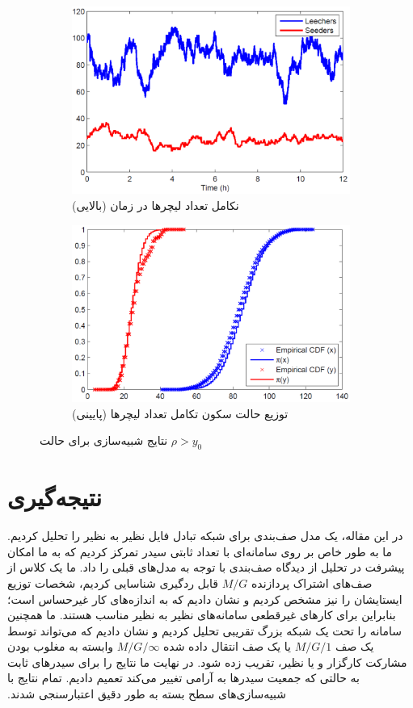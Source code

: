 \documentclass[11pt, oneside]{article}
\begin{document}
\begin{figure}[!ht]
	\centering
	\begin{subfigure}[b]{0.5\columnwidth}
		\centering
		\includegraphics[width=0.8\columnwidth]{resources/fig4_a.png}
		\caption{نکامل تعداد لیچرها در زمان (بالایی)}
	\end{subfigure}\hfill
	\begin{subfigure}[b]{0.5\columnwidth}
		\centering
		\includegraphics[width=0.8\columnwidth]{resources/fig4_b.png}
		\caption{توزیع حالت سکون تکامل تعداد لیچرها (پایینی)}
	\end{subfigure}
	\caption{نتایج شبیه‌سازی برای حالت $\rho>y_0$}
\end{figure}



\section{نتیجه‌گیری}

‫در این مقاله، یک مدل صف‌بندی برای شبکه تبادل فایل نظیر به نظیر را تحلیل کردیم. ما به طور خاص بر روی سامانه‌ای با تعداد ثابتی سیدر تمرکز کردیم که به ما امکان پیشرفت در تحلیل از دیدگاه صف‌بندی با توجه به مدل‌های قبلی را داد. ما یک کلاس از صف‌های اشتراک پردازنده $M/G$‌ قابل ردگیری  شناسایی کردیم، شخصات توزیع ایستایشان را نیز مشخص کردیم و نشان دادیم که به اندازه‌های کار غیرحساس است؛ بنابراین برای کارهای غیرقطعی سامانه‌های نظیر به نظیر مناسب هستند. ما همچنین سامانه را تحت یک شبکه بزرگ تقریبی تحلیل کردیم و نشان دادیم که می‌تواند توسط یک صف $M/G/1$ یا یک صف انتقال داده شده $M/G/\infty$ وابسته به مغلوب بودن مشارکت کارگزار و یا نظیر، تقریب زده شود. در نهایت ما نتایج را برای سیدرهای ثابت به حالتی که جمعیت سیدرها به آرامی تغییر می‌کند تعمیم دادیم. تمام نتایج با شبیه‌سازی‌های سطح بسته به طور دقیق اعتبارسنجی شدند.


\linespread{0.9}
\latinfont


\printendnotes[custom]
\end{document}
